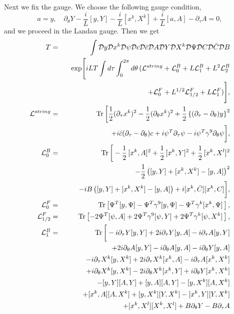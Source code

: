 \documentclass[a4paper,12pt]{article}
\newcommand{\nn}{\nonumber\\}
\newcommand{\calL}{\mathcal{L}}
\newcommand{\calD}{\mathcal{D}}
\newcommand{\ptau}{\partial_\tau}
\newcommand{\pth}{\partial_\theta}
\newcommand{\Tr}{\mathop{\mathrm{Tr}}}
\begin{document}
Next we fix the gauge. We choose the following gauge condition,
\begin{equation}
  a=y,\quad\pth Y-\frac{i}{L}[y,Y]
	-\frac{i}{L}[x^k,X^k]+\frac{i}{L}[a,A]
	-\ptau A=0,\label{fixing}
\end{equation}
and we proceed in the Landau gauge. Then we get
\begin{eqnarray}
 T&=&\int \calD y \calD x^k \calD\psi \calD c \calD\bar{c}
	\calD A \calD Y \calD X^k \calD \Psi \calD C \calD \bar{C}
	\calD B\nn
   &&\hspace{2ex}\exp\Biggl[iLT \int d\tau \int_0^{2\pi}
    d\theta\, (\calL^{string}+ \calL^B_0 +L\calL^B_1+L^2\calL^B_2\nn
    &&\hspace{23ex}+\calL^F_0 +L^{1/2}\calL^F_{1/2}
    +L\calL^F_1)\Biggr],\label{PI}\\
  \calL^{string}&=&\Tr\bigg[\frac{1}{2}(\ptau x^k)^2
	- \frac{1}{2}(\pth x^k)^2
	+\frac{1}{2}\left\{(\ptau -\pth)y\right\}^2\nn
  &&\hspace{2cm}+i\bar{c}(\ptau -\pth )c
	+ i\psi^T\ptau  \psi-i
	\psi^T\gamma^9\pth  \psi \bigg],\\
 \calL^B_0&=&\Tr\bigg[-\frac{1}{2}\,[x^k,A]^2+\frac{1}{2}\,[x^k,Y]^2
	+\frac{1}{2}\,[x^k,X^l]^2\nn
  &&\hspace{1ex}-\frac{1}{2}\left([y,Y]+[x^k,X^k]-[y,A]\right)^2\nn
  &&\hspace{1ex}-iB \left([y,Y]+[x^k,X^k]-[y,A]\right)
  +i[x^k,\bar{C}][x^k,C]\bigg],\label{freeb}\\
 \calL^F_0&=&\Tr\left[\Psi^T[y,\Psi]-\Psi^T\gamma^9[y,\Psi]-
		\Psi^T\gamma^k[x^k,\Psi]\,\right],\label{freef}\\
 \calL^F_{1/2}&=&\Tr\left[-2\Psi^T[\psi,A]+2\Psi^T\gamma^9[\psi,Y]
		+2\Psi^T\gamma^k[\psi,X^k]\,\right],\label{1f}\\
 \calL^B_1&=&\Tr\bigg[-i\ptau Y [y,Y]+2i\ptau Y [y,A]
	-i\ptau A [y,Y]\nn
  &&\hspace{4ex}+ 2i\pth A [y,Y]- i\pth A[y,A]-i\pth Y[y,A]\nn
  &&\hspace{4ex}-i\ptau X^k[y,X^k]+2i\ptau X^k[x^k,A]
	-i\ptau A[x^k,X^k]\nn
  &&\hspace{4ex}+i\pth X^k[y,X^k]-2i\pth X^k[x^k,Y]
	+i\pth Y[x^k,X^k]\nn
  &&\hspace{4ex}-[y,Y][A,Y]+[y,A][A,Y]-[y,X^k][A,X^k]\nn
  &&\hspace{4ex}+[x^k,A][A,X^k]+[y,X^k][Y,X^k]-[x^k,Y][Y,X^k]\nn
  &&\hspace{4ex}+[x^k,X^l][X^k,X^l]+B\pth Y-B\ptau A

\end{eqnarray}
\end{document}
